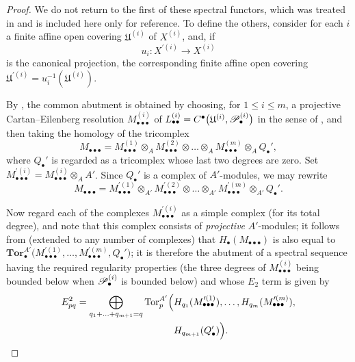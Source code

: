 \begin{proof}
We do not return to the first of these spectral functors, which was
treated in  and is included here only for reference.
To define the others, consider for each $i$ a finite affine open
covering $\mathfrak U^{(i)}$ of $X^{(i)}$, and, if
\[
  u_i:X^{\prime(i)}\longrightarrow X^{(i)}
\]
is the canonical projection, the corresponding finite affine open covering $\mathfrak U^{\prime(i)}
=
u_i^{-1}(\mathfrak U^{(i)})$.

By , the common abutment is obtained by choosing,
for $1\leq i\leq m$, a projective Cartan--Eilenberg resolution
$M_{\bullet\bullet\bullet}^{(i)}$ of $L_{\bullet\bullet}^{(i)}
=
C^\bullet
\bigl(
\mathfrak U^{(i)},\mathscr{P}_\bullet^{(i)}
\bigr)$
in the sense of , and then taking the homology of
the tricomplex
\[
  M_{\bullet\bullet\bullet}
  =
  M_{\bullet\bullet\bullet}^{(1)}
  \otimes_A
  M_{\bullet\bullet\bullet}^{(2)}
  \otimes\ldots\otimes_A
  M_{\bullet\bullet\bullet}^{(m)}
  \otimes_A Q_\bullet',
\]
where $Q_\bullet'$ is regarded as a tricomplex whose last two
degrees are zero.  Set $M_{\bullet\bullet\bullet}^{\prime(i)}
=
M_{\bullet\bullet\bullet}^{(i)}\otimes_AA'$.
Since $Q_\bullet'$ is a complex of $A'$-modules, we may rewrite
\[
  M_{\bullet\bullet\bullet}
  =
  M_{\bullet\bullet\bullet}^{\prime(1)}
  \otimes_{A'}
  M_{\bullet\bullet\bullet}^{\prime(2)}
  \otimes\ldots\otimes_{A'}
  M_{\bullet\bullet\bullet}^{\prime(m)}
  \otimes_{A'}Q_\bullet'.
\]

Now regard each of the complexes $M_{\bullet\bullet\bullet}^{\prime(i)}$ as a simple
complex (for its total degree), and note that this complex consists of \emph{projective}
$A'$-modules; it follows from  (extended to any number
of complexes) that $H_\bullet(M_{\bullet\bullet\bullet})$ is also equal to
$\mathbf{Tor}_\bullet^{A'}
\bigl(
M_{\bullet\bullet\bullet}^{\prime(1)},\ldots,
M_{\bullet\bullet\bullet}^{\prime(m)},Q_\bullet'
\bigr)$;
it is therefore  the abutment of a spectral sequence
having the required regularity properties (the three degrees of
$M_{\bullet\bullet\bullet}^{(i)}$ being bounded below when
$\mathscr{P}_\bullet^{(i)}$ is bounded below) and whose $E_2$ term is given by
\[
\begin{split}
  E_{pq}^2
  =
  \bigoplus_{q_1+\ldots+q_{m+1}=q}
  \operatorname{Tor}_p^{A'}
  \Bigl(
    &
    H_{q_1}(M_{\bullet\bullet\bullet}^{\prime(1)}),\ldots,
    H_{q_m}(M_{\bullet\bullet\bullet}^{\prime(m)}),
    \\
    &
    H_{q_{m+1}}(Q_\bullet')
  \Bigr).
\end{split}
\]


\end{proof}
